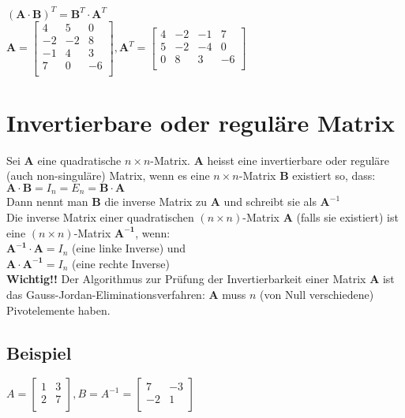 \documentclass[../main.tex]{subfiles}
\begin{document}
$(\mathbf{A} \cdot \mathbf{B})^T=\mathbf{B}^T \cdot \mathbf{A}^T$ \\ [7pt]

$\mathbf{A} = 
\begin{bmatrix}
    4 & 5 & 0 \\
    -2 & -2 & 8 \\
    -1 & 4 & 3 \\
    7 & 0 & -6 \\
\end{bmatrix},
\mathbf{A}^T = 
\begin{bmatrix}
    4 & -2 & -1 & 7 \\
    5 & -2 & -4 & 0 \\
    0 & 8 & 3 & -6 \\
\end{bmatrix}$

\section{Invertierbare oder reguläre Matrix}
Sei $\mathbf{A}$ eine quadratische $n\times n$-Matrix. $\mathbf{A}$ heisst eine invertierbare oder reguläre 
(auch non-singuläre) Matrix, wenn es eine $n\times n$-Matrix $\mathbf{B}$ existiert so, dass: \\ [7pt]
$\mathbf{A} \cdot \mathbf{B} = I_n = E_n = \mathbf{B} \cdot \mathbf{A}$ \\ [7pt]
Dann nennt man $\mathbf{B}$ die inverse Matrix zu $\mathbf{A}$ und schreibt sie als $\mathbf{A}^{-1}$ \\ [7pt]

Die inverse Matrix einer quadratischen $(n\times n)$-Matrix $\mathbf{A}$ (falls sie existiert) ist eine $(n\times n)$-Matrix $\mathbf{A^{-1}}$, wenn: \\ [7pt]
$\mathbf{A^{-1}}\cdot \mathbf{A} = I_n$ (eine linke Inverse) und \\ [7pt]
$\mathbf{A}\cdot \mathbf{A^{-1}} = I_n$ (eine rechte Inverse) \\ [7pt]
\textbf{Wichtig!!} Der Algorithmus zur Prüfung der Invertierbarkeit einer Matrix $\mathbf{A}$ ist das Gauss-Jordan-Eliminationsverfahren: 
$\mathbf{A}$ muss $n$ (von Null verschiedene) Pivotelemente haben.

\subsection{Beispiel}
$A=
\begin{bmatrix}
    1 & 3 \\
    2 & 7 \\
\end{bmatrix},
B=A^{-1}=
\begin{bmatrix}
    7 & -3 \\
    -2 & 1 \\
\end{bmatrix}$ \\ [7pt]
\end{document}
